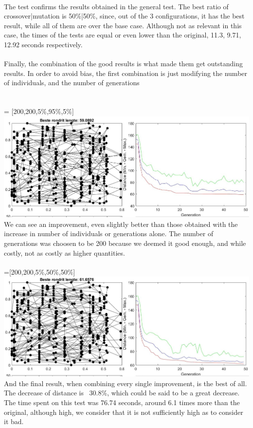 \\
The test confirms the results obtained in the general test. The best ratio of
crossover|mutation is 50\%|50\%, since, out of the 3 configurations, it has the
best result, while all of them are over the base case. Although not as relevant
in this case, the times of the tests are equal or even lower than the original, 11.3,
9.71, 12.92 seconds respectively. \\
\\
Finally, the combination of the good results is what made them get
outstanding results. In order to avoid bias, the first combination is just
modifying the number of individuals, and the number of generations\\
\\
\\
 = [200,200,5\%,95\%,5\%] \\
\includegraphics[width=\textwidth]{img/specific/xalt_edges/general_6.jpg}\\
We can see an improvement, even slightly better than those obtained with the
increase in number of individuals or generations alone. The number of
generations was choosen to be 200 because we deemed it good enough, and while
costly, not as costly as higher quantities.\\
\\
 =[200,200,5\%,50\%,50\%] \\
\includegraphics[width=\textwidth]{img/specific/xalt_edges/general_7.jpg}\\
And the final result, when combining every single improvement, is the best of
all. The decrease of distance is ~30.8\%, which could be said to be a great
decrease. The time spent on this test was 76.74 seconds, around 6.1 times
more than the original, although high, we consider that it is not
sufficiently high as to consider it bad. \\
\\

